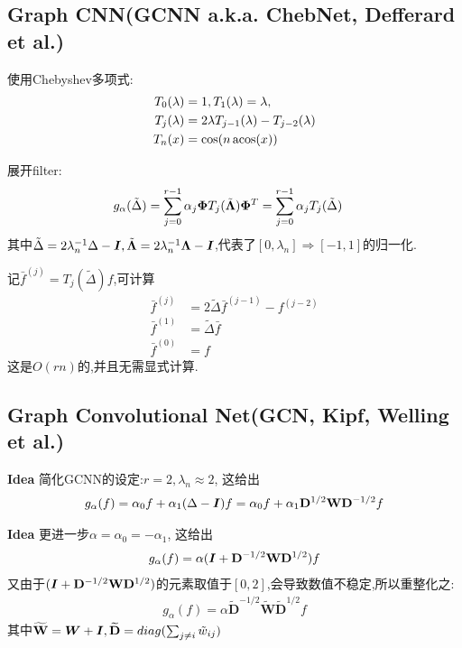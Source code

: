\documentclass{article}
\begin{document}
\subsection{Graph CNN(GCNN a.k.a. ChebNet, Defferard et al.)}

使用Chebyshev多项式:
\begin{align}
    T_0(\lambda)&=1,
    T_1(\lambda)=\lambda,\\
    T_j(\lambda)&=2\lambda T_{j-1}(\lambda)-T_{j-2}(\lambda)\\
    T_n(x)&=\cos(n \acos(x))
\end{align}

展开filter:
\begin{align}
    g_\alpha(\tilde \Delta)
    &=\sum_{j=0}^{r-1}\alpha_j \boldsymbol{\Phi}T_j(\tilde{\boldsymbol{\Lambda}})\boldsymbol{\Phi}^T
    =\sum_{j=0}^{r-1}\alpha_j T_j(\tilde{\Delta})
\end{align}
其中$\tilde{\Delta}=2\lambda_n^{-1} \Delta-\boldsymbol{I},\tilde{\boldsymbol{\Lambda}}=2\lambda_n^{-1} \boldsymbol{\Lambda}-\boldsymbol{I}$,代表了$[0,\lambda_n]\Rightarrow[-1,1]$的归一化.

记$\bar f^{(j)}=T_j(\tilde{\Delta})f$,可计算
\begin{align}
    \bar f^{(j)}&=2\tilde \Delta \bar f^{(j-1)}-f^{(j-2)}\\
    \bar f^{(1)}&=\tilde \Delta \bar f\\
    \bar f^{(0)}&=f
\end{align}
这是$O(rn)$的,并且无需显式计算\lop .

\subsection{Graph Convolutional Net(GCN, Kipf, Welling et al.)}

\textbf{Idea} 简化GCNN的设定:$r=2,\lambda_n\approx 2$,
这给出
\begin{align}
    g_\alpha(f)
=\alpha_0 f+\alpha_1(\Delta - \boldsymbol{I})f
=\alpha_0 f+\alpha_1\mathbf{D}^{1/2}\mathbf{W}\mathbf{D}^{-1/2}f
\end{align}

\textbf{Idea} 更进一步$\alpha=\alpha_0=-\alpha_1$,
这给出
\begin{align}
    g_\alpha(f)=\alpha (\boldsymbol{I}+\mathbf{D}^{-1/2}\mathbf{W}\mathbf{D}^{1/2})f
\end{align}
又由于$(\boldsymbol{I}+\mathbf{D}^{-1/2}\mathbf{W}\mathbf{D}^{1/2})$的元素取值于$[0,2]$,会导致数值不稳定,所以重整化之:
\begin{align}
    g_\alpha(f)=\alpha \widetilde{\mathbf{D}}^{-1/2}\widetilde{\mathbf{W}}\widetilde{\mathbf{D}}^{1/2}f
\end{align}
其中$\widetilde{\mathbf{W}}=\boldsymbol{W}+\boldsymbol{I},\widetilde{\mathbf{D}}=diag(\sum_{j\neq i}\tilde w_{ij})$
\end{document}
